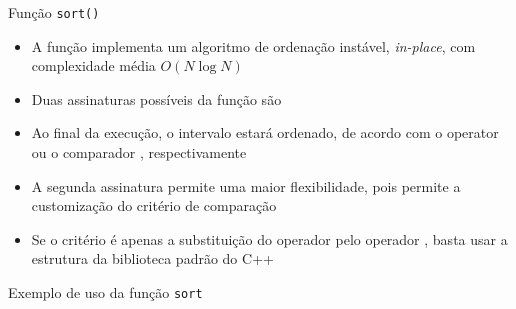 \begin{frame}[fragile]{Função \texttt{sort()}}

    \begin{itemize}
        \item A função  implementa um algoritmo de ordenação instável,
            \textit{in-place}, com complexidade média $O(N\log N)$

        \item Duas assinaturas possíveis da função  são

        \item Ao final da execução, o intervalo \code{c++}{[first, last)} estará ordenado, de
            acordo com o operator  ou o comparador , respectivamente

        \item A segunda assinatura permite uma maior flexibilidade, pois permite a customização
            do critério de comparação

        \item Se o critério é apenas a substituição do operador  pelo operador
            , basta usar a estrutura  da biblioteca padrão
            do C++

    \end{itemize}

\end{frame}

\begin{frame}[fragile]{Exemplo de uso da função \texttt{sort}}
\end{frame}

